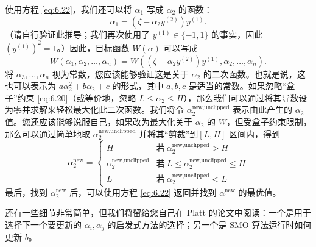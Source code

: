 使用方程 \eqref{eq:6.22}，我们还可以将 $\alpha_1$ 写成 $\alpha_2$ 的函数：
\[
    \alpha_1 = (\zeta - \alpha_2 y^{(2)}) y^{(1)}.
\]
（请自行验证此推导；我们再次使用了 $y^{(1)} \in \{-1, 1\}$ 的事实，因此 $(y^{(1)})^2 = 1$。）因此，目标函数 $W(\alpha)$ 可以写成
\[
    W(\alpha_1, \alpha_2, \dots, \alpha_n) = W((\zeta - \alpha_2 y^{(2)}) y^{(1)}, \alpha_2, \dots, \alpha_n).
\]
将 $\alpha_3, \dots, \alpha_n$ 视为常数，您应该能够验证这是关于 $\alpha_2$ 的二次函数。也就是说，这也可以表示为 $a\alpha_2^2 + b\alpha_2 + c$ 的形式，其中 $a, b, c$ 是适当的常数。如果忽略“盒子”约束 \eqref{eq:6.20}（或等价地，忽略 $L \le \alpha_2 \le H$），那么我们可以通过将其导数设为零并求解来轻松最大化此二次函数。我们将令 $\alpha_2^{\text{new,unclipped}}$ 表示由此产生的 $\alpha_2$ 值。您还应该能够说服自己，如果改为最大化关于 $\alpha_2$ 的 $W$，但受盒子约束限制，那么可以通过简单地取 $\alpha_2^{\text{new,unclipped}}$ 并将其“剪裁”到$[L, H]$ 区间内，得到
\[
    \alpha_2^{\text{new}} = \begin{cases}
        H & \text{若}\  \alpha_2^{\text{new,unclipped}} > H \\
        \alpha_2^{\text{new,unclipped}} & \text{若}\  L \le \alpha_2^{\text{new,unclipped}} \le H \\
        L & \text{若}\  \alpha_2^{\text{new,unclipped}} < L
    \end{cases}
\]
最后，找到 $\alpha_2^{\text{new}}$ 后，可以使用方程 \eqref{eq:6.22} 返回并找到 $\alpha_1^{\text{new}}$ 的最优值。

还有一些细节非常简单，但我们将留给您自己在 Platt 的论文中阅读：一个是用于选择下一个要更新的 $\alpha_i, \alpha_j$ 的启发式方法的选择；另一个是 SMO 算法运行时如何更新 $b$。